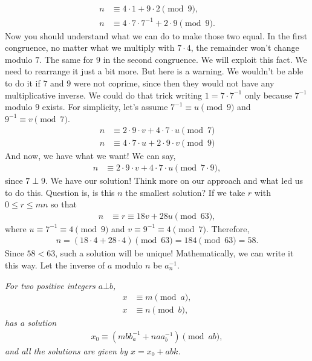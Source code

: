 \documentclass{subfile}
\begin{document}
		\begin{align*}
			n & \equiv4\cdot1+9\cdot2\pmod{9},\\
			n & \equiv4\cdot7\cdot7^{-1}+2\cdot9\pmod{9}.
		\end{align*}
	Now you should understand what we can do to make those two equal. In the first congruence, no matter what we multiply with $7\cdot4$, the remainder won't change modulo $7$. The same for $9$ in the second congruence. We will exploit this fact. We need to rearrange it just a bit more. But here is a warning. We wouldn't be able to do it if $7$ and $9$ were not coprime, since then they would not have any multiplicative inverse. We could do that trick writing $1=7\cdot7^{-1}$ only because $7^{-1}$ modulo $9$ exists. For simplicity, let's assume $7^{-1}\equiv u\pmod{9}$ and $9^{-1}\equiv v\pmod{7}$.
		\begin{align*}
			n & \equiv2\cdot9\cdot v+4\cdot7\cdot u\pmod{7}\\
			n & \equiv4\cdot7\cdot u+2\cdot9\cdot v\pmod{9}
		\end{align*}
	And now, we have what we want! We can say,
		\begin{align*}
			n & \equiv2\cdot9\cdot v+4\cdot7\cdot u\pmod{7\cdot9},
		\end{align*}
	since $7 \perp 9$. We have our solution! Think more on our approach and what led us to do this. Question is, is this $n$ the smallest solution? If we take $r$ with $0\leq r\leq mn$ so that
		\begin{align*}
			n & \equiv r\equiv18v+28u\pmod{63},
		\end{align*}
	where $u\equiv7^{-1}\equiv4\pmod9$ and $v\equiv9^{-1}\equiv4\pmod 7$. Therefore,
		\begin{align*}
			n = (18\cdot4+28\cdot4)\pmod{63}=184\pmod{63}=58.
		\end{align*}
	Since $58<63$, such a solution will be unique! Mathematically, we can write it this way. Let the inverse of $a$ modulo $n$ be $a^{-1}_n$.
		\begin{theorem}\slshape
			For two positive integers $a\bot b$,
				\begin{align*}
					x & \equiv m\pmod a,\\
					x & \equiv n\pmod b,
				\end{align*}
			has a solution
				\begin{align*}
					x_0 \equiv (mbb^{-1}_a+naa^{-1}_b)\pmod{ab},
				\end{align*}
			and all the solutions are given by $x=x_0+abk$.
		\end{theorem}
\end{document}
